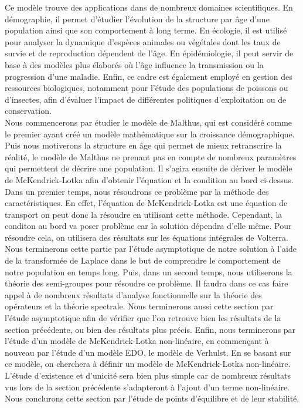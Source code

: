 Ce modèle trouve des applications dans de nombreux domaines scientifiques. En démographie, il permet d'étudier l'évolution de la structure par âge d'une population ainsi que son comportement à long terme. En écologie, il est utilisé pour analyser la dynamique d'espèces animales ou végétales dont les taux de survie et de reproduction dépendent de l'âge. En épidémiologie, il peut servir de base à des modèles plus élaborés où l'âge influence la transmission ou la progression d'une maladie. Enfin, ce cadre est également employé en gestion des ressources biologiques, notamment pour l'étude des populations de poissons ou d'insectes, afin d'évaluer l'impact de différentes politiques d'exploitation ou de conservation.
\\
Nous commencerons par étudier le modèle de Malthus, qui est considéré comme le premier ayant créé un modèle mathématique sur la croissance démographique. Puis nous motiverons la structure en âge qui permet de mieux retranscrire la réalité, le modèle de Malthus ne prenant pas en compte de nombreux paramètres qui permettent de décrire une population. Il s'agira ensuite de dériver le modèle de McKendrick-Lotka afin d'obtenir l'équation et la condition au bord ci-dessus. Dans un premier temps, nous résoudrons ce problème par la méthode des caractéristiques. En effet, l'équation de McKendrick-Lotka est une équation de transport on peut donc la résoudre en utilisant cette méthode. Cependant, la conditon au bord va poser problème car la solution dépendra d'elle même. Pour résoudre cela, on utilisera des résultats sur les équations intégrales de Volterra. Nous terminerons cette partie par l'étude asymptotique de notre solution à l'aide de la transformée de Laplace dans le but de comprendre le comportement de notre population en temps long. Puis, dans un second temps, nous utiliserons la théorie des semi-groupes pour résoudre ce problème. Il faudra dans ce cas faire appel à de nombreux résultats d'analyse fonctionnelle sur la théorie des opérateurs et la théorie spectrale. Nous terminerons aussi cette section par l'étude asymptotique afin de vérifier que l'on retrouve bien les résultats de la section précédente, ou bien des résultats plus précis. Enfin, nous terminerons par l'étude d'un modèle de McKendrick-Lotka non-linéaire, en commençant à nouveau par l'étude d'un modèle EDO, le modèle de Verhulst. En se basant sur ce modèle, on cherchera à définir un modèle de McKendrick-Lotka non-linéaire. L'étude d'existence et d'unicité sera bien plus simple car de nombreux résultats vus lors de la section précédente s'adapteront à l'ajout d'un terme non-linéaire. Nous conclurons cette section par l'étude de points d'équilibre et de leur stabilité.